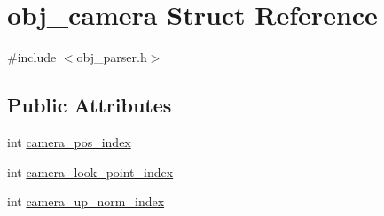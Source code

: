 \hypertarget{structobj__camera}{\section{obj\+\_\+camera Struct Reference}
\label{structobj__camera}
}


{\ttfamily \#include $<$obj\+\_\+parser.\+h$>$}

\subsection*{Public Attributes}
\begin{DoxyCompactItemize}
\item 
int \hyperlink{structobj__camera_a02c5e1c127fc81b0377d773572d82a8a}{camera\+\_\+pos\+\_\+index}
\item 
int \hyperlink{structobj__camera_ad795a90bb5ddd7298fac17af40317881}{camera\+\_\+look\+\_\+point\+\_\+index}
\item 
int \hyperlink{structobj__camera_a2d8ae90adcf03df3b2b28c3c13e1da5d}{camera\+\_\+up\+\_\+norm\+\_\+index}
\end{DoxyCompactItemize}


